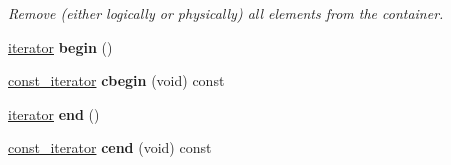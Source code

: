 \begin{DoxyCompactItemize}
\begin{DoxyCompactList}\small\item\em Remove (either logically or physically) all elements from the container. \end{DoxyCompactList}\item 
\hyperlink{classls_1_1MyBidirectionalIterator}{iterator} {\bfseries begin} ()\hypertarget{classls_1_1list_a73458e8145cc3ee958fb59940084ab61}{}\label{classls_1_1list_a73458e8145cc3ee958fb59940084ab61}

\item 
\hyperlink{classls_1_1MyBidirectionalIterator}{const\+\_\+iterator} {\bfseries cbegin} (void) const \hypertarget{classls_1_1list_aa5b9875385cfe9f72987147eb08ec4df}{}\label{classls_1_1list_aa5b9875385cfe9f72987147eb08ec4df}

\item 
\hyperlink{classls_1_1MyBidirectionalIterator}{iterator} {\bfseries end} ()\hypertarget{classls_1_1list_a23e842f652b4da5c445499dc81e67934}{}\label{classls_1_1list_a23e842f652b4da5c445499dc81e67934}

\item 
\hyperlink{classls_1_1MyBidirectionalIterator}{const\+\_\+iterator} {\bfseries cend} (void) const \hypertarget{classls_1_1list_a7d7c77c477cbadf86b4715fd185adfa8}{}\label{classls_1_1list_a7d7c77c477cbadf86b4715fd185adfa8}


\end{DoxyCompactItemize}
